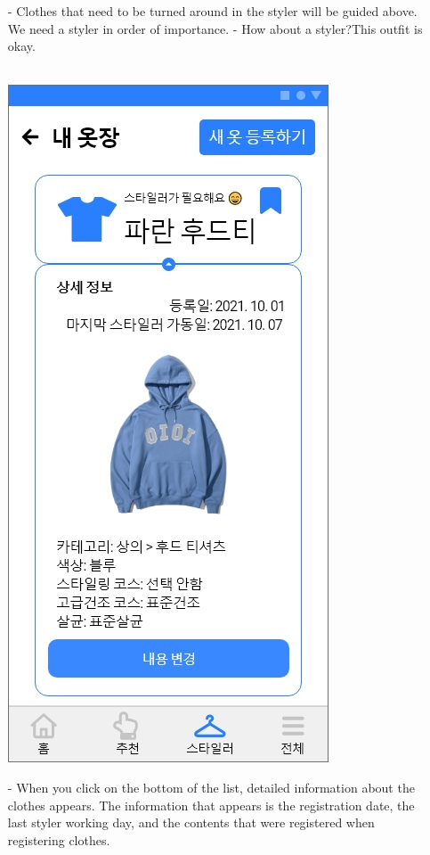 \documentclass[conference]{IEEEtran}
\begin{document}
\begin{enumerate}
\begin{enumerate}
 \item[-]Clothes that need to be turned around in the styler will be guided above. We need a styler in order of importance. - How about a styler?This outfit is okay. \\\\
 \centerline{\includegraphics[scale=0.32]{내 옷장2.jpg}}
 \item[-] When you click on the bottom of the list, detailed information about the clothes appears. The information that appears is the registration date, the last styler working day, and the contents that were registered when registering clothes.\\\\
 \end{enumerate}
 

\end{enumerate}
\end{document}
